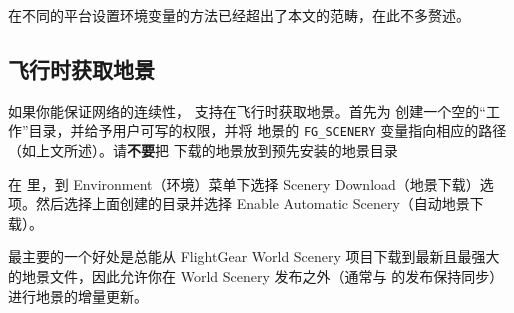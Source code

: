 \ifchinese
在不同的平台设置环境变量的方法已经超出了本文的范畴，在此不多赘述。
\fi

\ifchinese
\subsection{飞行时获取地景}
\fi

\ifchinese
如果你能保证网络的连续性，\FlightGear{} 支持在飞行时获取地景。首先为 \TerraSync{} 创建一个空的“工作”目录，并给予用户可写的权限，并将 \FlightGear{} 地景的 \texttt{FG\_SCENERY} 变量指向相应的路径（如上文所述）。请\textbf{不要}把 \TerraSync{} 下载的地景放到预先安装的地景目录

在 \FlightGear{} 里，到 Environment（环境）菜单下选择 Scenery Download（地景下载）选项。然后选择上面创建的目录并选择 Enable Automatic Scenery（自动地景下载）。

\TerraSync{} 最主要的一个好处是总能从 FlightGear World Scenery 项目下载到最新且最强大的地景文件，因此允许你在 World Scenery 发布之外（通常与 \FlightGear{} 的发布保持同步）进行地景的增量更新。
\fi
%
%

